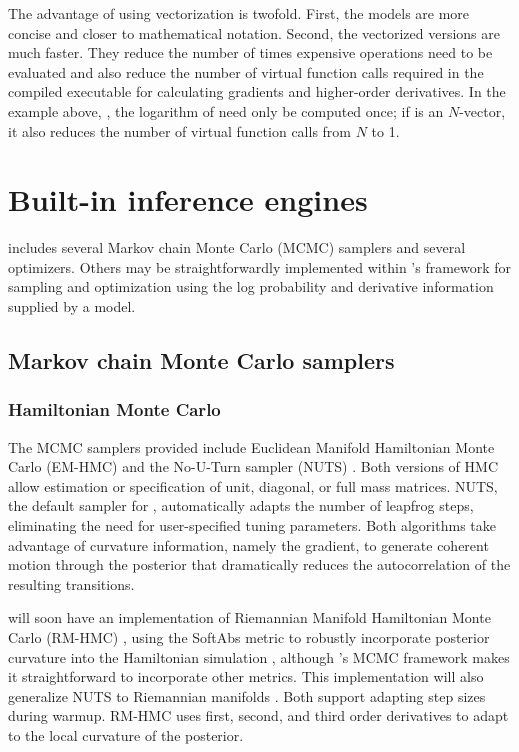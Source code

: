 \documentclass[article]{jss}
\begin{document}
The advantage of using vectorization is twofold.  First, the models
are more concise and closer to mathematical notation.  Second, the
vectorized versions are much faster.  They reduce the number of times
expensive operations need to be evaluated and also reduce the number
of virtual function calls required in the compiled 
executable for calculating gradients and higher-order derivatives.
In the example above, , the logarithm of  need only be computed
once; if  is an $N$-vector, it also reduces the number of
virtual function calls from $N$ to 1.

\section{Built-in inference engines}\label{inference-engines.section}

 includes several Markov chain Monte Carlo (MCMC)
samplers and several optimizers.  Others may be straightforwardly
implemented within 's  framework for
sampling and optimization using the log probability and derivative
information supplied by a model.

\subsection{Markov chain Monte Carlo samplers}

\subsubsection{Hamiltonian Monte Carlo}

The MCMC samplers provided include Euclidean Manifold Hamiltonian
Monte Carlo (EM-HMC) \citep{DuaneEtAl:1987, Neal:1994, Neal:2011} and
the No-U-Turn sampler (NUTS) \citep{HoffmanGelman:2011}.  Both
versions of HMC allow estimation or specification of unit, diagonal,
or full mass matrices.  NUTS, the default sampler for ,
automatically adapts the number of leapfrog steps, eliminating the
need for user-specified tuning parameters.  Both algorithms take
advantage of curvature information, namely the gradient, to generate
coherent motion through the posterior that dramatically reduces the
autocorrelation of the resulting transitions.

 will soon have an implementation of Riemannian Manifold
Hamiltonian Monte Carlo (RM-HMC) \citep{GirolamiCalderhead:2011},
using the SoftAbs metric to robustly incorporate posterior curvature
into the Hamiltonian simulation \cite{Betancourt:2012}, although
's MCMC framework makes it
straightforward to incorporate other metrics.  This
implementation will also generalize NUTS to Riemannian manifolds
\citep{Betancourt:2013}.  Both support adapting step sizes during
warmup.  RM-HMC uses first, second, and third order derivatives 
to adapt to the local curvature of the posterior.
\end{document}
